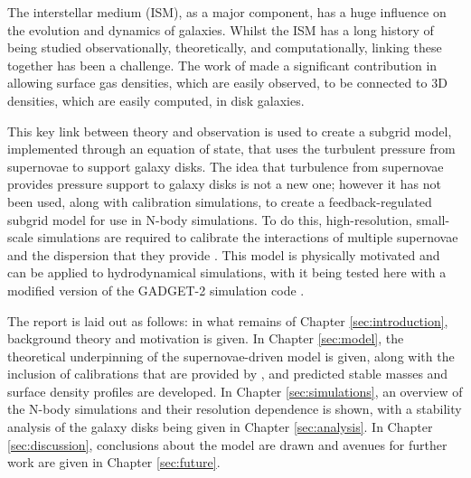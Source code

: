 The interstellar medium (ISM), as a major component, has a huge influence on the evolution and dynamics of galaxies.
Whilst the ISM has a long history of being studied observationally, theoretically, and computationally, linking these together has been a challenge.
The work of \citet{schaye_model-independent_2001} made a significant contribution in allowing surface gas densities, which are easily observed, to be connected to 3D densities, which are easily computed, in disk galaxies.

This key link between theory and observation is used to create a subgrid model, implemented through an equation of state, that uses the turbulent pressure from supernovae to support galaxy disks.
The idea that turbulence from supernovae provides pressure support to galaxy disks is not a new one; \citep{silk_feedback_1997, ostriker_maximally_2011, faucher-giguere_feedback-regulated_2013, martizzi_supernova_2016} however it has not been used, along with calibration simulations, to create a feedback-regulated subgrid model for use in N-body simulations.
To do this, high-resolution, small-scale simulations are required to calibrate the interactions of multiple supernovae and the dispersion that they provide \citep{martizzi_supernova_2015}.
This model is physically motivated and can be applied to hydrodynamical simulations, with it being tested here with a modified version of the GADGET-2 simulation code \citep{springel_cosmological_2003, springel_cosmological_2005}.

The report is laid out as follows: in what remains of Chapter \ref{sec:introduction}, background theory and motivation is given.
In Chapter \ref{sec:model}, the theoretical underpinning of the supernovae-driven model is given, along with the inclusion of calibrations that are provided by \citet{martizzi_supernova_2015}, and predicted stable masses and surface density profiles are developed.
In Chapter \ref{sec:simulations}, an overview of the N-body simulations and their resolution dependence is shown, with a stability analysis of the galaxy disks being given in Chapter \ref{sec:analysis}.
In Chapter \ref{sec:discussion}, conclusions about the model are drawn and avenues for further work are given in Chapter \ref{sec:future}.
